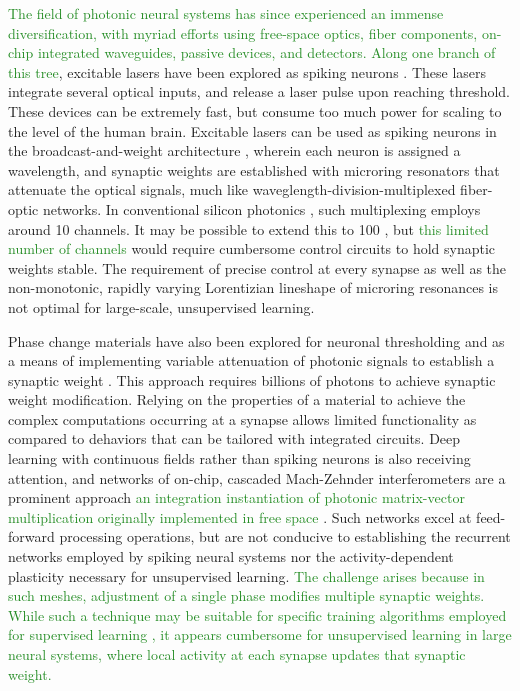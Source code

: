 \documentclass{article}
\begin{document}
\begin{multicols}{2}
\textcolor{ForestGreen}{The field of photonic neural systems has since experienced an immense diversification, with myriad efforts using free-space optics, fiber components, on-chip integrated waveguides, passive devices, and detectors. Along one branch of this tree}, excitable lasers have been explored as spiking neurons \cite{prsh2017}. These lasers integrate several optical inputs, and release a laser pulse upon reaching threshold. These devices can be extremely fast, but consume too much power for scaling to the level of the human brain. Excitable lasers can be used as spiking neurons in the broadcast-and-weight architecture \cite{tana20142}, wherein each neuron is assigned a wavelength, and synaptic weights are established with microring resonators that attenuate the optical signals, much like waveglength-division-multiplexed fiber-optic networks. In conventional silicon photonics \textcolor{ForestGreen}{\cite{li2005}}, such multiplexing employs around 10 channels. It may be possible to extend this to 100 \cite{prsh2011,tana20142}, but \textcolor{ForestGreen}{this limited number of channels} would require cumbersome control circuits to hold synaptic weights stable. The requirement of precise control at every synapse as well as the non-monotonic, rapidly varying Lorentizian lineshape of microring resonances is not optimal for large-scale, unsupervised learning. 

Phase change materials have also been explored for neuronal thresholding \cite{chsa2018} and as a means of implementing variable attenuation of photonic signals to establish a synaptic weight \cite{chri2017}. This approach requires billions of photons to achieve synaptic weight modification. Relying on the properties of a material to achieve the complex computations occurring at a synapse allows limited functionality as compared to dehaviors that can be tailored with integrated circuits. Deep learning with continuous fields rather than spiking neurons is also receiving attention, and networks of on-chip, cascaded Mach-Zehnder interferometers are a prominent approach \cite{shha2016}\textcolor{ForestGreen}{\textemdash an integration instantiation of photonic matrix-vector multiplication originally implemented in free space \cite{godi1978}}. Such networks excel at feed-forward processing operations, but are not conducive to establishing the recurrent networks employed by spiking neural systems nor the activity-dependent plasticity necessary for unsupervised learning. \textcolor{ForestGreen}{The challenge arises because in such meshes, adjustment of a single phase modifies multiple synaptic weights. While such a technique may be suitable for specific training algorithms employed for supervised learning \cite{humi2018}, it appears cumbersome for unsupervised learning in large neural systems, where local activity at each synapse updates that synaptic weight.}


\end{multicols}
\end{document}
